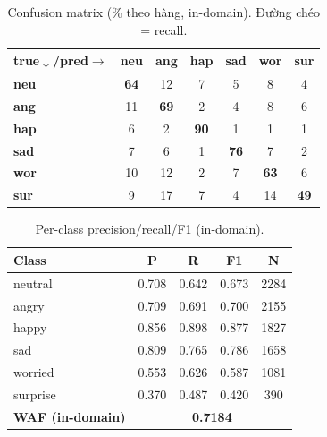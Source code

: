 \documentclass[10pt]{article}
\begin{document}
\begin{table}[H]\centering\footnotesize\setlength{\tabcolsep}{4pt}
\begin{tabular}{lcccccc}
\toprule
\textbf{true$\downarrow$/pred$\rightarrow$} & \textbf{neu} & \textbf{ang} & \textbf{hap} & \textbf{sad} & \textbf{wor} & \textbf{sur} \\
\midrule
\textbf{neu} & \cellcolor{cmblue!45}\textbf{64} & \cellcolor{cmblue!9}12 & \cellcolor{cmblue!5}7 & \cellcolor{cmblue!3}5 & \cellcolor{cmblue!6}8 & \cellcolor{cmblue!3}4 \\
\textbf{ang} & \cellcolor{cmblue!8}11 & \cellcolor{cmblue!48}\textbf{69} & \cellcolor{cmblue!1}2 & \cellcolor{cmblue!3}4 & \cellcolor{cmblue!6}8 & \cellcolor{cmblue!4}6 \\
\textbf{hap} & \cellcolor{cmblue!4}6 & \cellcolor{cmblue!1}2 & \cellcolor{cmblue!63}\textbf{90} & \cellcolor{cmblue!0}1 & \cellcolor{cmblue!1}1 & \cellcolor{cmblue!1}1 \\
\textbf{sad} & \cellcolor{cmblue!5}7 & \cellcolor{cmblue!4}6 & \cellcolor{cmblue!1}1 & \cellcolor{cmblue!54}\textbf{76} & \cellcolor{cmblue!5}7 & \cellcolor{cmblue!1}2 \\
\textbf{wor} & \cellcolor{cmblue!7}10 & \cellcolor{cmblue!9}12 & \cellcolor{cmblue!2}2 & \cellcolor{cmblue!5}7 & \cellcolor{cmblue!44}\textbf{63} & \cellcolor{cmblue!4}6 \\
\textbf{sur} & \cellcolor{cmblue!7}9 & \cellcolor{cmblue!12}17 & \cellcolor{cmblue!5}7 & \cellcolor{cmblue!3}4 & \cellcolor{cmblue!10}14 & \cellcolor{cmblue!34}\textbf{49} \\
\bottomrule
\end{tabular}
\caption{Confusion matrix (\% theo hàng, in-domain). Đường chéo = recall.}
\end{table}

\begin{table}[H]\centering\footnotesize
\begin{tabular}{lcccc}
\toprule
\textbf{Class} & \textbf{P} & \textbf{R} & \textbf{F1} & \textbf{N} \\
\midrule
neutral & 0.708 & 0.642 & 0.673 & 2284 \\
angry & 0.709 & 0.691 & 0.700 & 2155 \\
happy & 0.856 & 0.898 & 0.877 & 1827 \\
sad & 0.809 & 0.765 & 0.786 & 1658 \\
worried & 0.553 & 0.626 & 0.587 & 1081 \\
surprise & 0.370 & 0.487 & 0.420 & 390 \\
\midrule
\textbf{WAF (in-domain)} & \multicolumn{4}{c}{\textbf{0.7184}} \\
\bottomrule
\end{tabular}
\caption{Per-class precision/recall/F1 (in-domain).}
\end{table}
\end{document}
